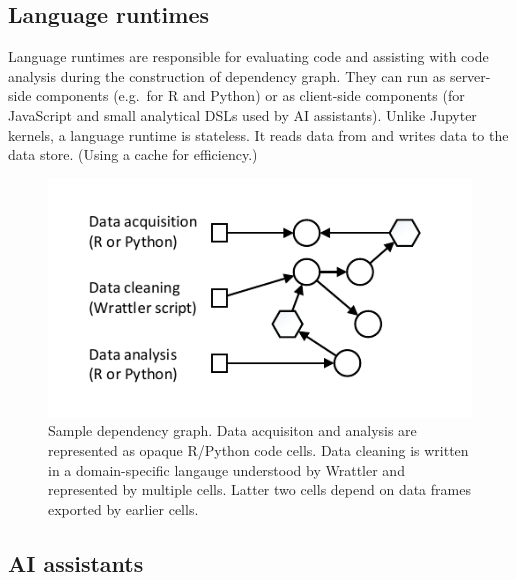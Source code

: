 \documentclass[sigplan,preprint,10pt]{acmart}\settopmatter{printfolios=true,printccs=false,printacmref=false}
\theoremstyle{plain}
\theoremstyle{definition}
\begin{document}
\subsection{Language runtimes}

Language runtimes are responsible for evaluating code and assisting with code analysis during
the construction of dependency graph. They can run as server-side components (e.g.~for R and Python) 
or as client-side components (for JavaScript and small analytical DSLs used by AI assistants). 
Unlike Jupyter kernels, a language runtime is stateless. It reads data from and writes data to
the data store. (Using a cache for efficiency.)


\begin{figure}
\includegraphics[scale=1,trim=0.5cm 0.5cm 0.5cm 0.5cm]{graph.pdf}

\caption{\small{Sample dependency graph. Data acquisiton and analysis are represented as 
opaque R/Python code cells. Data cleaning is written in a domain-specific langauge understood by
Wrattler and represented by multiple cells. Latter two cells depend on data frames exported by
earlier cells.}}
\label{fig:deps}
\vspace{-0.5em}
\end{figure}

\subsection{AI assistants}
\label{sec:wrattler-ai}
\end{document}
